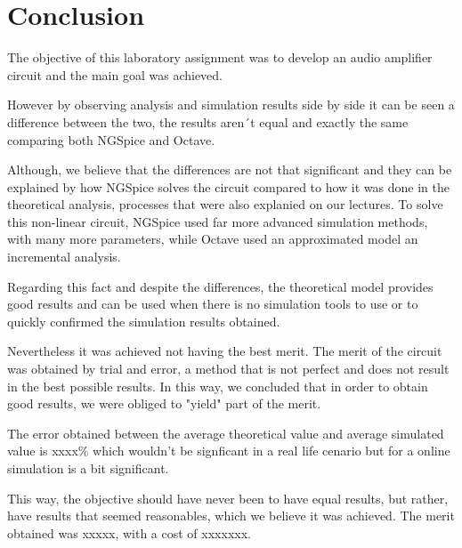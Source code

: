 \newpage
\section{Conclusion}
\label{sec:conclusion}

\hspace{0,5cm} The objective of this laboratory assignment was to develop an audio amplifier circuit and the main goal was achieved. 

\par However by observing analysis and simulation results side by side it can be seen a difference between the two, the results aren´t equal and exactly the same comparing both NGSpice and Octave. 
\par Although, we believe that the differences are not that significant and they can be explained by how NGSpice solves the circuit compared to how it was done in the theoretical analysis, processes that were also explanied on our lectures. To solve this non-linear circuit, NGSpice used far more advanced simulation methods, with many more parameters, while Octave used an approximated model an incremental analysis. 
\par Regarding this fact and despite the differences, the theoretical model provides good results and can be used when there is no simulation tools to use or to quickly confirmed the simulation results obtained.

\par Nevertheless it was achieved not having the best merit. The merit of the circuit was obtained by trial and error, a method that is not perfect and does not result in the best possible results. In this way, we concluded that in order to obtain good results, we were obliged to "yield" part of the merit.

\par The error obtained between the average theoretical value and average simulated value is xxxx\% which wouldn't be signficant in a real life cenario but for a online simulation is a bit significant.

\par This way, the objective should have never been to have equal results, but rather, have results that seemed reasonables, which we believe it was achieved. The merit obtained was xxxxx, with a cost of xxxxxxx.



